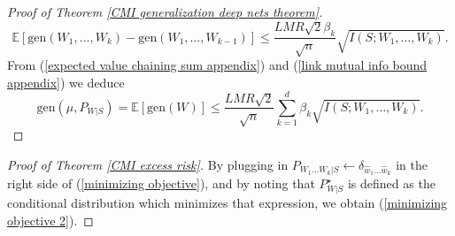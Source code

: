 \documentclass{article}
\newcommand{\E}{\mathbb{E}}
\newcommand{\gen}{\mathrm{gen}}
\begin{document}
\begin{proof}[Proof of Theorem \ref{CMI generalization deep nets theorem}]
	\begin{equation}
		\E[\gen(W_1,\dots,W_k)-\gen(W_1,\dots,W_{k-1})]\leq\frac{LMR\sqrt{2}\beta_k}{\sqrt{n}} \sqrt{I(S;W_1,\dots,W_k)}.\label{link mutual info bound appendix}
	\end{equation}
	From (\ref{expected value chaining sum appendix}) and (\ref{link mutual info bound appendix}) we deduce 
	\begin{equation}
		\gen(\mu,P_{W|S})=\E[\gen(W)]\leq \frac{LMR\sqrt{2}}{\sqrt{n}}\sum_{k=1}^d \beta_k \sqrt{I(S;W_1,\dots,W_k)}.\nonumber
	\end{equation}
\end{proof}

\begin{proof}[Proof of Theorem \ref{CMI excess risk}]
By plugging in $P_{W_1\dots W_k|S}\leftarrow \delta_{\widehat{w}_1\dots \widehat{w}_k}$ in the right side of (\ref{minimizing objective}), and by noting that $P_{W|S}^{\star}$ is defined as the conditional distribution which minimizes that expression, we obtain (\ref{minimizing objective 2}). 
\end{proof}
\end{document}
